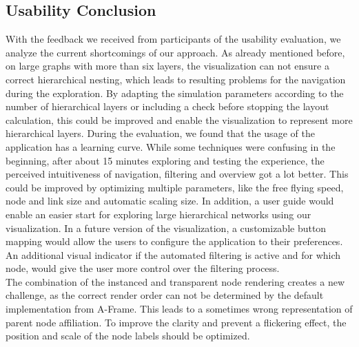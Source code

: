\subsection{Usability Conclusion}
With the feedback we received from participants of the usability evaluation, we analyze the current shortcomings of our approach.
As already mentioned before, on large graphs with more than six layers, the visualization can not ensure a correct hierarchical nesting, which leads to resulting problems for the navigation during the exploration. 
By adapting the simulation parameters according to the number of hierarchical layers or including a check before stopping the layout calculation, this could be improved and enable the visualization to represent more hierarchical layers.
During the evaluation, we found that the usage of the application has a learning curve. 
While some techniques were confusing in the beginning, after about 15 minutes exploring and testing the experience, the perceived intuitiveness of navigation, filtering and overview got a lot better.
This could be improved by optimizing multiple parameters, like the free flying speed, node and link size and automatic scaling size. 
In addition, a user guide would enable an easier start for exploring large hierarchical networks using our visualization.
In a future version of the visualization, a customizable button mapping would allow the users to configure the application to their preferences.
An additional visual indicator if the automated filtering is active and for which node, would give the user more control over the filtering process.
\\
The combination of the instanced and transparent node rendering creates a new challenge, as the correct render order can not be determined by the default implementation from A-Frame. This leads to a sometimes wrong representation of parent node affiliation.
To improve the clarity and prevent a flickering effect, the position and scale of the node labels should be optimized.
